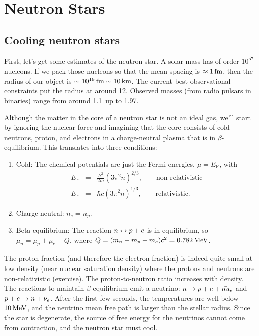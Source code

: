 \chapter{Neutron Stars}

\section{Cooling neutron stars}\label{s.cooling-neutron-stars}
First, let's get some estimates of the neutron star.  A solar mass has of order $10^{57}$ nucleons.  If we pack those nucleons so that the mean spacing is $\approx 1\,\mathrm{fm}$, then the radius of our object is $\sim 10^{19}\,\mathrm{fm}\sim 10\,\mathrm{k}\mathrm{m}$.  The current best observational constraints put the radius at around 12\nsp\km.  Observed masses (from radio pulsars in binaries) range from around 1.1\nsp\Msun\ up to 1.97\nsp\Msun.

Although the matter in the core of a neutron star is not an ideal gas, we'll start by ignoring the nuclear force and imagining that the core consists of cold  neutrons, proton, and electrons in a charge-neutral plasma that is in $\beta$-equilibrium. This translates into three conditions:
\begin{enumerate}
\item\label{cold-neutron-star} Cold: The chemical potentials are just the Fermi energies, $\mu = E_{\mathrm{F}}$, with
\begin{eqnarray}
	E_{\mathrm{F}} &=& \frac{\hbar^{2}}{2m}\left(3\pi^{2}n\right)^{2/3},\qquad\textrm{non-relativistic}\\
	E_{\mathrm{F}} &=& \hbar c\left(3\pi^{2}n\right)^{1/3},\qquad\textrm{relativistic}.
\end{eqnarray}
\item\label{charge-neutral-star} Charge-neutral: $n_{e} = n_{p}$.
\item\label{beta-equil-star} Beta-equilibrium: The reaction $n\leftrightarrow p+e$ is in equilibrium, so 
$ \mu_{n} = \mu_{p}+\mu_{e} - Q$,
where $Q = (m_{n}-m_{p}-m_{e})c^{2} = 0.782\,\mathrm{M}\mathrm{eV}$.
\end{enumerate}

The proton fraction (and therefore the electron fraction) is indeed quite small at low density (near nuclear saturation density) where the protons and neutrons are non-relativistic (exercise).  The proton-to-neutron ratio increases with density.  The reactions to maintain $\beta$-equilibrium emit a neutrino: $n \to p + e + \bar{nu}_{e}$ and $p + e \to n + \nu_{e}$.  After the first few seconds, the temperatures are well below $10\,\mathrm{M}\mathrm{eV}$, and the neutrino mean free path is larger than the stellar radius.  Since the star is degenerate, the source of free energy for the neutrinos cannot come from contraction, and the neutron star must cool.

